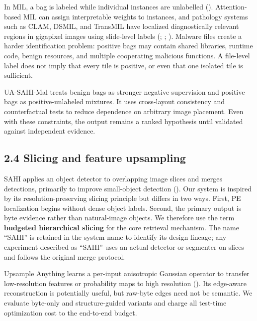 \documentclass[
  10pt,
]{article}
\begin{document}
In MIL, a bag is labeled while individual instances are unlabelled
().
Attention-based MIL can assign interpretable weights to instances, and
pathology systems such as CLAM, DSMIL, and TransMIL have localized
diagnostically relevant regions in gigapixel images using slide-level
labels (;
;
). Malware files create
a harder identification problem: positive bags may contain shared
libraries, runtime code, benign resources, and multiple cooperating
malicious functions. A file-level label does not imply that every tile
is positive, or even that one isolated tile is sufficient.

UA-SAHI-Mal treats benign bags as stronger negative supervision and
positive bags as positive-unlabeled mixtures. It uses cross-layout
consistency and counterfactual tests to reduce dependence on arbitrary
image placement. Even with these constraints, the output remains a
ranked hypothesis until validated against independent evidence.

\subsection{2.4 Slicing and feature
upsampling}\label{slicing-and-feature-upsampling}

SAHI applies an object detector to overlapping image slices and merges
detections, primarily to improve small-object detection
(). Our
system is inspired by its resolution-preserving slicing principle but
differs in two ways. First, PE localization begins without dense object
labels. Second, the primary output is byte evidence rather than
natural-image objects. We therefore use the term \textbf{budgeted
hierarchical slicing} for the core retrieval mechanism. The name
``SAHI'' is retained in the system name to identify its design lineage;
any experiment described as ``SAHI'' uses an actual detector or
segmenter on slices and follows the original merge protocol.

Upsample Anything learns a per-input anisotropic Gaussian operator to
transfer low-resolution features or probability maps to high resolution
(). Its
edge-aware reconstruction is potentially useful, but raw-byte edges need
not be semantic. We evaluate byte-only and structure-guided variants and
charge all test-time optimization cost to the end-to-end budget.
\end{document}

